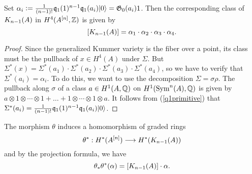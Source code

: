 \begin{proposition}\label{KummerClass}
Set $\alpha_i \defIs  \frac{1}{(n-1)!}\kq_{1}(1)^{n-1}\kq_1(a_i)\vac = \G_0(a_i)1$. Then the corresponding class of %
$\kum{A}{n-1}$ in $H^4(A\hilb{n},\Z)$ is given by
$$
[\kum{A}{n-1}]=\alpha_1\cdot\alpha_2\cdot\alpha_3\cdot\alpha_4.
$$ 
\end{proposition}
\begin{proof}
Since the generalized Kummer variety is the fiber over a point, its 
class must be the pullback of $x\in H^4(A)$ under $\Sigma$. But $\Sigma^* (x) = \Sigma^*(a_1)\cdot \Sigma^*(a_2)\cdot \Sigma^*(a_3)\cdot \Sigma^*(a_4)$, so we have to verify that $\Sigma^* (a_i) = \alpha_i$. To do this, we want to use the decomposition $\Sigma = \sigma\rho$.
The pullback along $\sigma$ of a class $a\in H^1(A,\Q)$ on $H^1(\Sym^n(A),\Q)$ 
is given by $a\otimes 1\otimes \cdots\otimes 1 + \ldots + 1\otimes \cdots\otimes 1\otimes a$. It follows from (\ref{q1primitive}) that $\Sigma^* (a_i) = \frac{1}{(n-1)!}\kq_{1}(1)^{n-1}\kq_1(a_i)\vac $.
\end{proof}
The morphism $\theta$ induces a homomorphism of graded rings
\begin{equation}
\theta^* :H^*(A\hilb{n})\longrightarrow H^*(\kum{A}{n-1})
\end{equation}
and by the projection formula, we have
\begin{equation}
\theta_*\theta^*(\alpha)  = [\kum{A}{n-1}]\cdot\alpha.
\end{equation}

